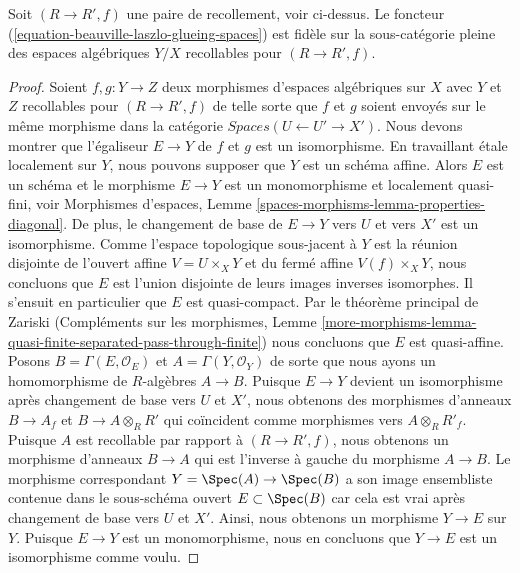 \begin{lemma}
\label{lemma-glueing-f}
Soit $(R \to R', f)$ une paire de recollement, voir ci-dessus.
Le foncteur (\ref{equation-beauville-laszlo-glueing-spaces})
est fidèle sur la sous-catégorie pleine des
espaces algébriques $Y/X$ recollables pour $(R \to R', f)$.
\end{lemma}

\begin{proof}
Soient $f, g : Y \to Z$ deux morphismes d'espaces algébriques sur $X$
avec $Y$ et $Z$ recollables pour $(R \to R', f)$ de telle sorte que $f$ et $g$ soient envoyés
sur le même morphisme dans la catégorie $\textit{Spaces}(U \leftarrow U' \to X')$.
Nous devons montrer que l'égaliseur $E \to Y$ de $f$ et $g$ est un isomorphisme.
En travaillant \'etale localement sur $Y$, nous pouvons supposer que $Y$ est un schéma affine.
Alors $E$ est un schéma et le morphisme $E \to Y$ est un monomorphisme
et localement quasi-fini, voir Morphismes d'espaces, Lemme
\ref{spaces-morphisms-lemma-properties-diagonal}.
De plus, le changement de base de $E \to Y$ vers $U$ et vers $X'$ est
un isomorphisme. Comme l'espace topologique sous-jacent à $Y$ est la réunion disjointe de l'ouvert affine
$V = U \times_X Y$ et du fermé affine $V(f) \times_X Y$, nous concluons que $E$ est l'union disjointe de leurs images inverses isomorphes.  
Il s'ensuit en particulier que $E$ est quasi-compact.  
Par le théorème principal de Zariski (Compléments sur les morphismes, Lemme \ref{more-morphisms-lemma-quasi-finite-separated-pass-through-finite})  
nous concluons que $E$ est quasi-affine.  
Posons $B = \Gamma(E, \mathcal{O}_E)$ et $A = \Gamma(Y, \mathcal{O}_Y)$  
de sorte que nous ayons un homomorphisme de $R$-algèbres $A \to B$.  
Puisque $E \to Y$ devient un isomorphisme après changement de base vers $U$ et $X'$,  
nous obtenons des morphismes d'anneaux $B \to A_f$ et $B \to A \otimes_R R'$  
qui coïncident comme morphismes vers $A \otimes_R R'_f$. Puisque $A$ est recollable  
par rapport à $(R \to R', f)$, nous obtenons un morphisme d'anneaux $B \to A$ qui est l'inverse à gauche  
du morphisme $A \to B$. Le morphisme correspondant $Y = \Spec(A) \to \Spec(B)$  
a son image ensembliste contenue dans le sous-schéma ouvert $E \subset \Spec(B)$ car  
cela est vrai après changement de base vers $U$ et $X'$. Ainsi, nous obtenons un morphisme $Y \to E$ sur $Y$. Puisque $E \to Y$ est un monomorphisme, nous en concluons que $Y \to E$ est un isomorphisme comme voulu. 
\end{proof}

